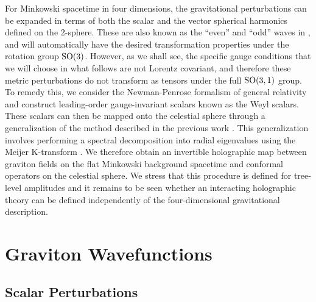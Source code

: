 \documentclass{brownthesis}
\begin{document}
For Minkowski spacetime in four dimensions, the gravitational perturbations
can be expanded in terms of both the scalar and the vector spherical
harmonics defined on the 2-sphere. These are also known as the ``even''
and ``odd'' waves in \cite{PhysRev.108.1063}, and will automatically
have the desired transformation properties under the rotation group
${\rm SO(3)}$. However, as we shall see, the specific gauge conditions
that we will choose in what follows are not Lorentz covariant, and
therefore these metric perturbations do not transform as tensors under
the full ${\rm SO(3,1)}$ group. To remedy this, we consider the Newman-Penrose
formalism \cite{doi:10.1063/1.1724257} of general relativity and
construct leading-order gauge-invariant scalars known as the Weyl
scalars. These scalars can then be mapped onto the celestial sphere
through a generalization of the method described in the previous work
\cite{Liu:2021tif}. This generalization involves performing a spectral
decomposition into radial eigenvalues using the Meijer K-transform
\cite{meijer1940a,meijer1940b}. We therefore obtain an invertible
holographic map between graviton fields on the flat Minkowski background
spacetime and conformal operators on the celestial sphere. We stress
that this procedure is defined for tree-level amplitudes and it remains
to be seen whether an interacting holographic theory can be defined
independently of the four-dimensional gravitational description.

\section{Graviton Wavefunctions}

\subsection{Scalar Perturbations}
\end{document}
